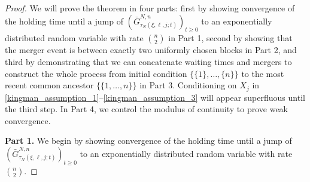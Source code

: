 \documentclass[a4paper,11pt]{article}
\theoremstyle{definition}
\begin{document}
\begin{proof}
We will prove the theorem in four parts: first by showing convergence of the holding time until a jump of $( \bar{G}_{ \tau_N( \xi, \ell, j; t ) }^{ N, n } )_{ t \geq 0 }$ to an exponentially distributed random variable with rate $\binom{n}{2}$ in Part 1, second by showing that the merger event is between exactly two uniformly chosen blocks in Part 2, and third by demonstrating that we can concatenate waiting times and mergers to construct the whole process from initial condition $\{ \{ 1 \}, \ldots, \{ n \} \}$ to the most recent common ancestor $\{ \{ 1, \ldots, n \} \}$ in Part 3.
Conditioning on $X_j$ in \eqref{kingman_assumption_1}--\eqref{kingman_assumption_3} will appear superfluous until the third step.
In Part 4, we control the modulus of continuity to prove weak convergence.

\textbf{Part 1.} We begin by showing convergence of the holding time until a jump of $( \bar{G}_{ \tau_N( \xi, \ell, j; t ) }^{ N, n } )_{ t \geq 0 }$ to an exponentially distributed random variable with rate $\binom{n}{2}$.


\end{proof}
\end{document}

